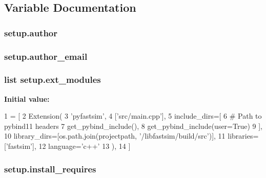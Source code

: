 \subsection{Variable Documentation}
\subsubsection[{\texorpdfstring{author}{author}}]{\setlength{\rightskip}{0pt plus 5cm}setup.\+author}\hypertarget{namespacesetup_a3a57a4772d418a06835249cbade0d86a}{}\label{namespacesetup_a3a57a4772d418a06835249cbade0d86a}
\subsubsection[{\texorpdfstring{author\+\_\+email}{author_email}}]{\setlength{\rightskip}{0pt plus 5cm}setup.\+author\+\_\+email}\hypertarget{namespacesetup_a5b08034343aa2be607722a8b315f3625}{}\label{namespacesetup_a5b08034343aa2be607722a8b315f3625}
\subsubsection[{\texorpdfstring{ext\+\_\+modules}{ext_modules}}]{\setlength{\rightskip}{0pt plus 5cm}list setup.\+ext\+\_\+modules}\hypertarget{namespacesetup_a657516be9ed3c70ce05f5f6918206934}{}\label{namespacesetup_a657516be9ed3c70ce05f5f6918206934}
{\bfseries Initial value\+:}
\begin{DoxyCode}
1 = [
2     Extension(
3         \textcolor{stringliteral}{'pyfastsim'},
4         [\textcolor{stringliteral}{'src/main.cpp'}],
5         include\_dirs=[
6             \textcolor{comment}{# Path to pybind11 headers}
7             get\_pybind\_include(),
8             get\_pybind\_include(user=\textcolor{keyword}{True})
9         ],
10         library\_dirs=[os.path.join(projectpath, \textcolor{stringliteral}{'/libfastsim/build/src'})],
11         libraries=[\textcolor{stringliteral}{'fastsim'}],
12         language=\textcolor{stringliteral}{'c++'}
13     ),
14 ]
\end{DoxyCode}
\subsubsection[{\texorpdfstring{install\+\_\+requires}{install_requires}}]{\setlength{\rightskip}{0pt plus 5cm}setup.\+install\+\_\+requires}\hypertarget{namespacesetup_abead4f26b530856f858f0d44c7cf2588}{}\label{namespacesetup_abead4f26b530856f858f0d44c7cf2588}
